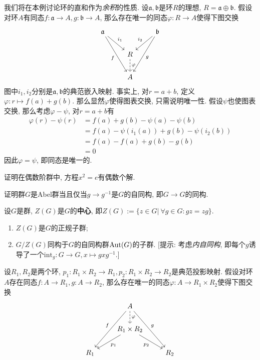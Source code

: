 \begin{eg}
    我们将在本例讨论环的直和作为\textit{余积}的性质.
    设$\mathfrak{a},\mathfrak{b}$是环$R$的理想, $R=\mathfrak{a}\oplus\mathfrak{b}$.
    假设对环$A$有同态$f:\mathfrak{a}\to A,g:\mathfrak{b}\to A$, 那么存在唯一的同态$\varphi:R\to A$使得下图交换
    \[\begin{tikzcd}
        \mathfrak{a}\ar[dr,"i_1"]\ar[ddr,"f"'] & & \mathfrak{b}\ar[dl,"i_2"']\ar[ddl,"g"]\\
        & R\ar[d, dashed, "\varphi"] & \\
        & A &
    \end{tikzcd}\]
    图中$i_1,i_2$分别是$\mathfrak{a},\mathfrak{b}$的典范嵌入映射.
    事实上, 对$r=a+b$, 定义$\varphi:r\mapsto f(a)+g(b)$.
    那么显然$\varphi$使得图表交换, 只需说明唯一性.
    假设$\psi$也使图表交换, 那么考虑$\varphi-\psi$, 对$r=a+b$有
    \begin{align*}
        \varphi(r)-\psi(r)&=f(a)+g(b)-\psi(a)-\psi(b)\\
        &=f(a)-\psi(i_1(a))+g(b)-\psi(i_2(b))\\
        &=f(a)-f(a)+g(b)-g(b)\\
        &=0
    \end{align*}
    因此$\varphi=\psi$, 即同态是唯一的.
\end{eg}

\begin{ex}
    证明在偶数阶群中, 方程$x^2=e$有偶数个解.
\end{ex}

\begin{ex}
    证明群$G$是Abel群当且仅当$g\to g^{-1}$是$G$的自同构, 即$G\to G$的同构.
\end{ex}

\begin{ex}\label{center}
    设$G$是群, $Z(G)$是$G$的\textbf{中心}, 即$Z(G):=\{z\in G|\ \forall g\in G:gz=zg\}$.
    \begin{enumerate}[(1)]
        \item $Z(G)$是$G$的正规子群;
        \item $G/Z(G)$同构于$G$的自同构群$\operatorname{Aut}(G)$的子群.
        [提示: 考虑{\itshape 内自同构}, 即每个$g$诱导了一个$\mathrm{int}_g:G\to G,x\mapsto gxg^{-1}$.]
    \end{enumerate}
\end{ex}

\begin{ex}
    设$R_1,R_2$是两个环, $p_1:R_1\times R_2\to R_1,p_2:R_1\times R_2\to R_2$是典范投影映射.
    假设对环$A$存在同态$f:A\to R_1,g:A\to R_2$, 那么存在唯一的同态$\varphi:A\to R_1\times R_2$使得下图交换
    \[\begin{tikzcd}
        & A\ar[ddl, "f"'] \ar[ddr, "g"] \ar[d, dashed, "\varphi"] & \\
        & R_1\times R_2\ar[dl, "p_1"] \ar[dr, "p_2"'] & \\
        R_1 & & R_2
    \end{tikzcd}\]
\end{ex}


